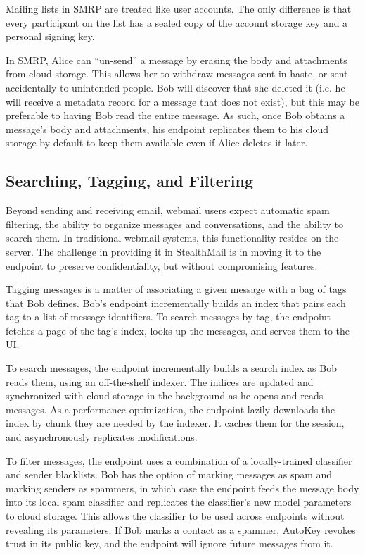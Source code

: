 Mailing lists in SMRP are treated like user accounts.  The only difference is that every participant on the list has a sealed copy of the account storage key and a personal signing key.

In SMRP, Alice can ``un-send'' a message by erasing the body and attachments from cloud storage.  This allows her to withdraw messages sent in haste, or sent accidentally to unintended people.  Bob will discover that she deleted it (i.e. he will receive a metadata record for a message that does not exist), but this may be preferable to having Bob read the entire message.  As such, once Bob obtains a message’s body and attachments, his endpoint replicates them to his cloud storage by default to keep them available even if Alice deletes it later.

\subsection{Searching, Tagging, and Filtering}
Beyond sending and receiving email, webmail users expect automatic spam filtering, the ability to organize messages and conversations, and the ability to search them.  In traditional webmail systems, this functionality resides on the server.  The challenge in providing it in StealthMail is in moving it to the endpoint to preserve confidentiality, but without compromising features.

Tagging messages is a matter of associating a given message with a bag of tags that Bob defines.  Bob’s endpoint incrementally builds an index that pairs each tag to a list of message identifiers.  To search messages by tag, the endpoint fetches a page of the tag’s index, looks up the messages, and serves them to the UI.

To search messages, the endpoint incrementally builds a search index as Bob reads them, using an off-the-shelf indexer.  The indices are updated and synchronized with cloud storage in the background as he opens and reads messages.  As a performance optimization, the endpoint lazily downloads the index by chunk they are needed by the indexer.  It caches them for the session, and asynchronously replicates modifications.

To filter messages, the endpoint uses a combination of a locally-trained classifier and sender blacklists.  Bob has the option of marking messages as spam and marking senders as spammers, in which case the endpoint feeds the message body into its local spam classifier and replicates the classifier’s new model parameters to cloud storage.  This allows the classifier to be used across endpoints without revealing its parameters.  If Bob marks a contact as a spammer, AutoKey revokes trust in its public key, and the endpoint will ignore future messages from it.


